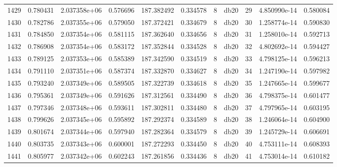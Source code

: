 \begin{tabular}{lrrrrrrlrrr}
1429 &    0.780431 &        2.037358e+06 &  0.576696 &              187.382492 &    0.334578 &       8 &         db20 &     29 &   4.850990e-14 &      0.580084 \\
1430 &    0.782786 &        2.037355e+06 &  0.579050 &              187.372421 &    0.334679 &       8 &         db20 &     30 &   1.258774e-14 &      0.590830 \\
1431 &    0.784850 &        2.037354e+06 &  0.581115 &              187.362640 &    0.334656 &       8 &         db20 &     31 &   1.258010e-14 &      0.592713 \\
1432 &    0.786908 &        2.037354e+06 &  0.583172 &              187.352844 &    0.334528 &       8 &         db20 &     32 &   4.802692e-14 &      0.594427 \\
1433 &    0.789125 &        2.037353e+06 &  0.585389 &              187.342590 &    0.334519 &       8 &         db20 &     33 &   4.798125e-14 &      0.596213 \\
1434 &    0.791110 &        2.037351e+06 &  0.587374 &              187.332870 &    0.334627 &       8 &         db20 &     34 &   1.247190e-14 &      0.597982 \\
1435 &    0.793240 &        2.037349e+06 &  0.589505 &              187.322739 &    0.334618 &       8 &         db20 &     35 &   1.247665e-14 &      0.599677 \\
1436 &    0.795361 &        2.037349e+06 &  0.591626 &              187.312561 &    0.334490 &       8 &         db20 &     36 &   4.798375e-14 &      0.601477 \\
1437 &    0.797346 &        2.037348e+06 &  0.593611 &              187.302811 &    0.334480 &       8 &         db20 &     37 &   4.797965e-14 &      0.603195 \\
1438 &    0.799626 &        2.037345e+06 &  0.595892 &              187.292374 &    0.334589 &       8 &         db20 &     38 &   1.246064e-14 &      0.604900 \\
1439 &    0.801674 &        2.037344e+06 &  0.597940 &              187.282364 &    0.334579 &       8 &         db20 &     39 &   1.245729e-14 &      0.606691 \\
1440 &    0.803735 &        2.037343e+06 &  0.600001 &              187.272293 &    0.334450 &       8 &         db20 &     40 &   4.753111e-14 &      0.608393 \\
1441 &    0.805977 &        2.037342e+06 &  0.602243 &              187.261856 &    0.334436 &       8 &         db20 &     41 &   4.753014e-14 &      0.610182 \\

\end{tabular}
